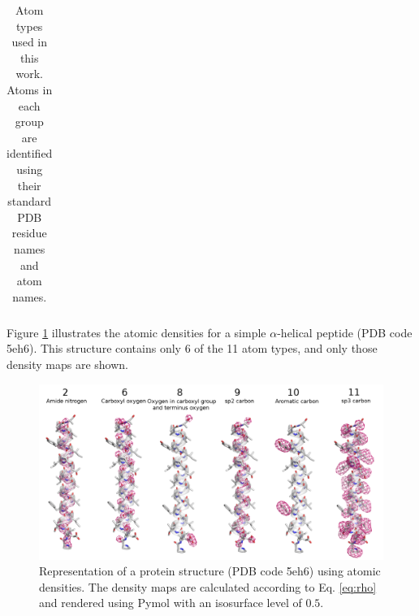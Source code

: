 \begin{table}[H]
\begin{center}
\begin{tabular}{ c | l | l }
\end{tabular}
    
    \caption {Atom types used in this work. Atoms in each group are
    identified using their standard PDB residue names and atom names.}

    \label{Tbl:atomTypes}
\end{center}
\end{table}

Figure \ref{Fig:atomic_densities} illustrates the atomic densities for
a simple $\alpha$-helical peptide (PDB code 5eh6). This structure
contains only 6 of the 11 atom types, and only those density maps are
shown.

\begin{figure}[H]
    \centering
    \includegraphics[width=\linewidth]{Fig/atomic_densities_V3.png}

    \caption{Representation of a protein structure (PDB code 5eh6)
    using atomic densities. The density maps are calculated according
    to Eq. \ref{eq:rho} and rendered using Pymol \cite{} with an
    isosurface level of $0.5$.}

    \label{Fig:atomic_densities}
\end{figure}
